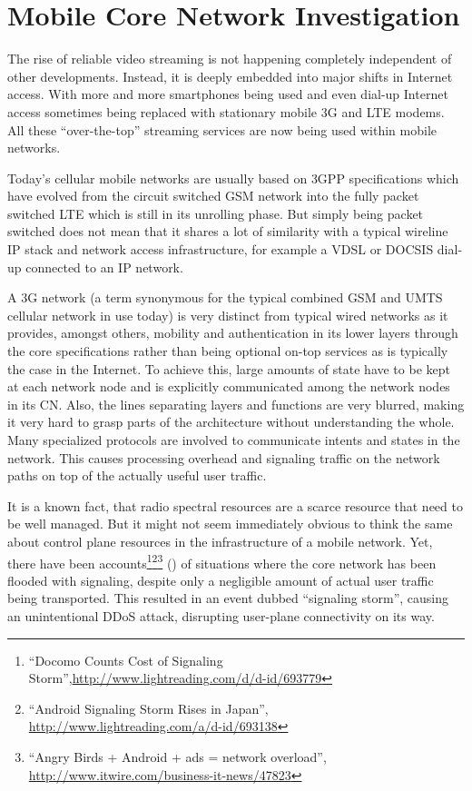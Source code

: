 \chapter{Mobile Core Network Investigation}
\label{chap:mobilenets}

The rise of reliable video streaming is not happening completely independent of other developments. Instead, it is deeply embedded into major shifts in Internet access. With more and more smartphones being used and even dial-up Internet access sometimes being replaced with stationary mobile \gls{3G} and \gls{LTE} modems. All these ``over-the-top'' streaming services are now being used within mobile networks.

Today's cellular mobile networks are usually based on \gls{3GPP} specifications which have evolved from the circuit switched \gls{GSM} network into the fully packet switched \gls{LTE} which is still in its unrolling phase. But simply being packet switched does not mean that it shares a lot of similarity with a typical wireline \gls{IP} stack and network access infrastructure, for example a \gls{VDSL} or \gls{DOCSIS} dial-up connected to an \gls{IP} network. 

A \gls{3G} network (a term synonymous for the typical combined \gls{GSM} and \gls{UMTS} cellular network in use today) is very distinct from typical wired networks as it provides, amongst others, mobility and authentication in its lower layers through the core specifications rather than being optional on-top services as is typically the case in the Internet. To achieve this, large amounts of state have to be kept at each network node and is explicitly communicated among the network nodes in its \gls{CN}. Also, the lines separating layers and functions are very blurred, making it very hard to grasp parts of the architecture without understanding the whole. Many specialized protocols are involved to communicate intents and states in the network. This causes processing overhead and signaling traffic on the network paths on top of the actually useful user traffic. 

It is a known fact, that radio spectral resources are a scarce resource that need to be well managed. But it might not seem immediately obvious to think the same about control plane resources in the infrastructure of a mobile network. Yet, there have been accounts\footnote{``Docomo Counts Cost of Signaling Storm'',\url{http://www.lightreading.com/d/d-id/693779}}\footnote{``Android Signaling Storm Rises in Japan'', \url{http://www.lightreading.com/a/d-id/693138}}\footnote{``Angry Birds + Android + ads = network overload'', \url{http://www.itwire.com/business-it-news/47823}} (\cite{huawei2011storm}) of situations where the core network has been flooded with signaling, despite only a negligible amount of actual user traffic being transported. This resulted in an event dubbed ``signaling storm'', causing an unintentional \gls{DDoS} attack, disrupting user-plane connectivity on its way.

